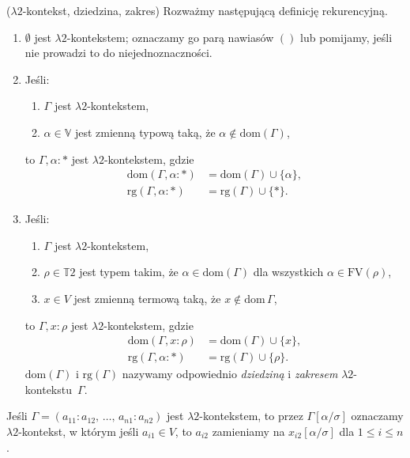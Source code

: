 \begin{definicja}(\(\lambda 2\)-kontekst, dziedzina, zakres)\label{def:f_statement}
  Rozważmy następującą definicję rekurencyjną.
  \begin{enumerate}[label=(E\arabic*), ref=(E\arabic*)]
  \setlength\itemsep{0em}
  \item \(\emptyset\) jest \(\lambda 2\)-kontekstem; oznaczamy go parą nawiasów
    \(()\)  lub pomijamy, jeśli nie prowadzi to do niejednoznaczności.\label{def:f_context_1}
  \item Jeśli:\label{def:f_context_2}
    \begin{enumerate}
    \item \(\Gamma\) jest \(\lambda 2\)-kontekstem,    \item \(\alpha\in\mathbb{V}\) jest zmienną typową taką, że \(\alpha\not\in \mathrm{dom}(\Gamma)\),
    \end{enumerate}
    to \(\Gamma, \alpha:*\) jest \(\lambda 2\)-kontekstem, gdzie 
      \begin{align*} 
        \mathrm{dom}(\Gamma, \alpha:*)&=\mathrm{dom}(\Gamma) \cup \{\alpha\},\\
        \mathrm{rg}(\Gamma, \alpha:*)&=\mathrm{rg}(\Gamma)\cup\{*\}.
      \end{align*}
  \item Jeśli:\label{def:f_context_3}
    \begin{enumerate}
     \setlength\itemsep{0em}
     \item \(\Gamma\) jest \(\lambda 2\)-kontekstem,
     \item \(\rho\in\mathbb{T}2\) jest typem takim, że \(\alpha\in\mathrm{dom}(\Gamma)\) dla wszystkich \(\alpha\in\mathrm{FV}(\rho)\),
     \item \(x\in V\) jest zmienną termową taką, że \(x\not\in\mathrm{dom}\,\Gamma\),
    \end{enumerate}
      to \(\Gamma, x:\rho\) jest \(\lambda 2\)-kontekstem, gdzie 
      \begin{align*} 
        \mathrm{dom}(\Gamma, x:\rho)&=\mathrm{dom}(\Gamma) \cup  \{x\},\\
      \mathrm{rg}(\Gamma, \alpha:*)&=\mathrm{rg}(\Gamma)\cup\{\rho\}.
      \end{align*}
      \(\mathrm{dom}(\Gamma)\) i \(\mathrm{rg}(\Gamma)\) nazywamy odpowiednio \emph{dziedziną} i \emph{zakresem} \(\lambda 2\)-kontekstu~\(\Gamma\).
  \end{enumerate}
    Jeśli \(\Gamma=(a_{11}: a_{12},\,\dots,\,a_{n1}:a_{n2})\) jest \(\lambda 2\)-kontekstem, to przez \(\Gamma[\alpha/\sigma]\) oznaczamy \(\lambda 2\)-kontekst, w którym jeśli \(a_{i1}\in V\), to \(a_{i2}\) zamieniamy na \(x_{i2}[\alpha/\sigma]\)  dla \(1\leq i \leq n\).
\end{definicja}

